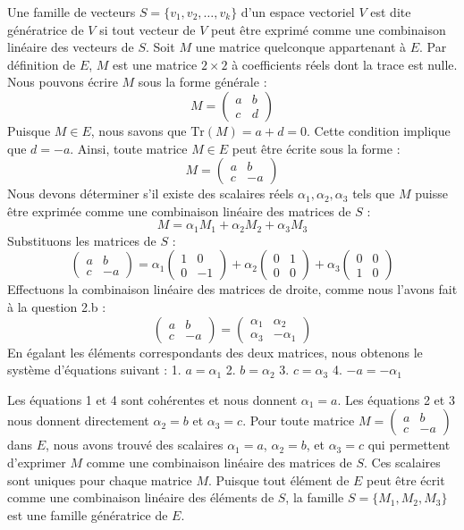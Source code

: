 \documentclass{report}
\begin{document}
Une famille de vecteurs $S = \{v_1, v_2, \dots, v_k\}$ d'un espace vectoriel $V$ est dite génératrice de $V$ si tout vecteur de $V$ peut être exprimé comme une combinaison linéaire des vecteurs de $S$.
Soit $M$ une matrice quelconque appartenant à $E$. Par définition de $E$, $M$ est une matrice $2 \times 2$ à coefficients réels dont la trace est nulle.
Nous pouvons écrire $M$ sous la forme générale :
$$ M = \begin{pmatrix} a & b \\ c & d \end{pmatrix} $$
Puisque $M \in E$, nous savons que $\text{Tr}(M) = a+d = 0$. Cette condition implique que $d = -a$.
Ainsi, toute matrice $M \in E$ peut être écrite sous la forme :
$$ M = \begin{pmatrix} a & b \\ c & -a \end{pmatrix} $$
Nous devons déterminer s'il existe des scalaires réels $\alpha_1, \alpha_2, \alpha_3$ tels que $M$ puisse être exprimée comme une combinaison linéaire des matrices de $S$ :
$$ M = \alpha_1 M_1 + \alpha_2 M_2 + \alpha_3 M_3 $$
Substituons les matrices de $S$ :
$$ \begin{pmatrix} a & b \\ c & -a \end{pmatrix} = \alpha_1 \begin{pmatrix} 1 & 0 \\ 0 & -1 \end{pmatrix} + \alpha_2 \begin{pmatrix} 0 & 1 \\ 0 & 0 \end{pmatrix} + \alpha_3 \begin{pmatrix} 0 & 0 \\ 1 & 0 \end{pmatrix} $$
Effectuons la combinaison linéaire des matrices de droite, comme nous l'avons fait à la question 2.b :
$$ \begin{pmatrix} a & b \\ c & -a \end{pmatrix} = \begin{pmatrix} \alpha_1 & \alpha_2 \\ \alpha_3 & -\alpha_1 \end{pmatrix} $$
En égalant les éléments correspondants des deux matrices, nous obtenons le système d'équations suivant :
1.  $a = \alpha_1$
2.  $b = \alpha_2$
3.  $c = \alpha_3$
4.  $-a = -\alpha_1$

Les équations 1 et 4 sont cohérentes et nous donnent $\alpha_1 = a$.
Les équations 2 et 3 nous donnent directement $\alpha_2 = b$ et $\alpha_3 = c$.
Pour toute matrice $M = \begin{pmatrix} a & b \\ c & -a \end{pmatrix}$ dans $E$, nous avons trouvé des scalaires $\alpha_1 = a$, $\alpha_2 = b$, et $\alpha_3 = c$ qui permettent d'exprimer $M$ comme une combinaison linéaire des matrices de $S$. Ces scalaires sont uniques pour chaque matrice $M$.
Puisque tout élément de $E$ peut être écrit comme une combinaison linéaire des éléments de $S$, la famille $S = \{M_1, M_2, M_3\}$ est une famille génératrice de $E$.
\end{document}
